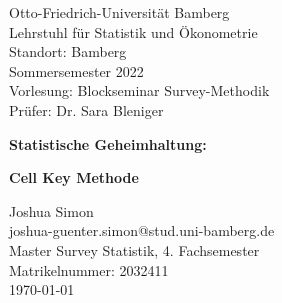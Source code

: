 

\thispagestyle{empty}%

{\raggedright%
Otto-Friedrich-Universität Bamberg\\%
Lehrstuhl für Statistik und Ökonometrie\\%
Standort: Bamberg\\%
Sommersemester 2022\\%
Vorlesung: Blockseminar Survey-Methodik\\%
Prüfer: Dr. Sara Bleniger\\%
}%

\vspace*{\fill}%
\begin{center}%
    \textbf{\Huge{Statistische Geheimhaltung:}}%
\end{center}%
\begin{center}%
    {\linespread{2.5}
    \textbf{\Huge{Cell Key Methode}}%
    }
\end{center}%
\vfill%

{%
\raggedleft%
Joshua Simon\\%
joshua-guenter.simon@stud.uni-bamberg.de\\%
Master Survey Statistik, 4. Fachsemester\\%
Matrikelnummer: 2032411\\%
\today\\}%


\newpage%

